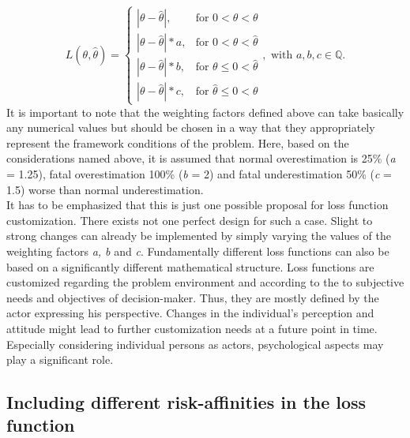 		\begin{equation}\label{eq:LF_final}
		L(\theta,\hat{\theta}) =
		\begin{cases}
		|\theta - \hat{\theta}|, & \text{for } 0<\hat{\theta}<\theta  \\
		|\theta-\hat{\theta}|*a, & \text{for } 0<\theta<\hat{\theta} \\
		|\theta-\hat{\theta}|*b, & \text{for } \theta\leq0<\hat{\theta} \\
		|\theta-\hat{\theta}|*c, & \text{for } \hat{\theta}\leq0<\theta 
		\end{cases},
		\text{ with } a,b,c \in \mathbb{Q}.
		\end{equation}  
		It is important to note that the weighting factors defined above can take basically any numerical values but should be chosen in a way that they appropriately represent the framework conditions of the problem. Here, based on the considerations named above, it is assumed that normal overestimation is 25\% (\textit{a} = 1.25), fatal overestimation 100\% (\textit{b} = 2) and fatal underestimation 50\% (\textit{c} = 1.5) worse than normal underestimation. \\		
		It has to be emphasized that this is just one possible proposal for loss function customization. There exists not one perfect design for such a case. Slight to strong changes can already be implemented by simply varying the values of the weighting factors \textit{a, b} and \textit{c}. Fundamentally different loss functions can also be based on a significantly different mathematical structure. Loss functions are customized regarding the problem environment and according to the to subjective needs and objectives of decision-maker. Thus, they are mostly defined by the actor expressing his perspective. Changes in the individual's perception and attitude might lead to further customization needs at a future point in time. Especially considering individual persons as actors, psychological aspects may play a significant role.
		
		\subsection{Including different risk-affinities in the loss function}
		
